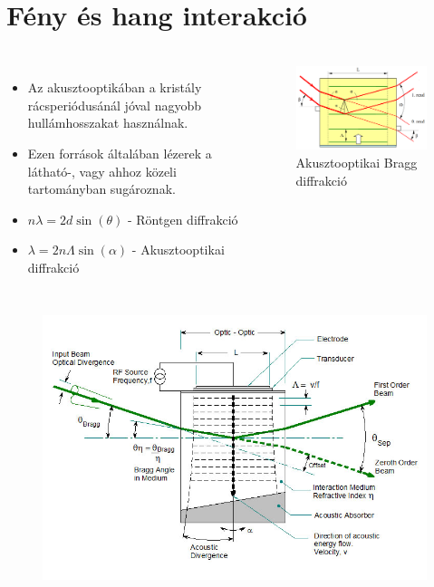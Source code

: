 \documentclass[aspectratio=169]{beamer}
\begin{document}
\section{Fény és hang interakció}
\begin{frame}
\frametitle{\secname}
\begin{columns}
\begin{itemize}
\item Az akusztooptikában a kristály rácsperiódusánál jóval nagyobb hullámhosszakat használnak.
\item Ezen források általában lézerek a látható-, vagy ahhoz közeli tartományban sugároznak.
\item $n\lambda=2d\sin(\theta)$ - Röntgen diffrakció
\item $\lambda=2n\Lambda\sin(\alpha)$ - Akusztooptikai diffrakció
\end{itemize}
\begin{figure}
\includegraphics[width=.95\textwidth]{bragg-diff.png}
\caption{Akusztooptikai Bragg diffrakció}
\end{figure}
\end{columns}
\end{frame}

\begin{frame}
\begin{figure}
\includegraphics[width=.8\textwidth]{isomet.jpg}
\end{figure}
\end{frame}
\end{document}
